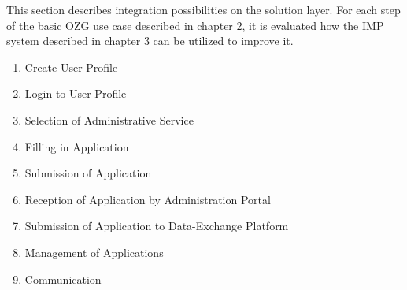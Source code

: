 This section describes integration possibilities on the solution layer. For each step of the basic OZG use case described in chapter 2, it is evaluated how the IMP system described in chapter 3 can be utilized to improve it. 

\begin{enumerate}
    \item{Create User Profile}
    \item{Login to User Profile}
    \item{Selection of Administrative Service}
    \item{Filling in Application}
    \item{Submission of Application}
    \item{Reception of Application by Administration Portal}
    \item{Submission of Application to Data-Exchange Platform}
    \item{Management of Applications}
    \item{Communication}
\end{enumerate}


